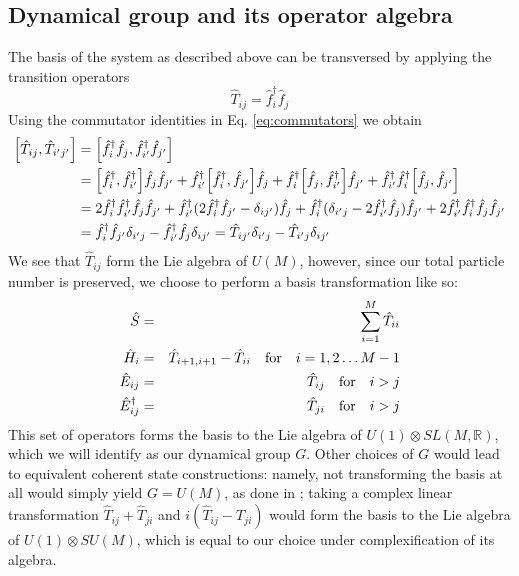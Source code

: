 \documentclass[12pt]{article}
\newcommand{\hc}{^\dagger}
\begin{document}
	\subsection{Dynamical group and its operator algebra}
	The basis of the system as described above can be transversed by applying the transition operators
	\begin{equation}
	\hat{T}_{ij}=\hat{f}\hc_i\hat{f}_j
	\end{equation}
	Using the commutator identities in Eq. \ref{eq:commutators} we obtain
	\begin{align}\label{eq:transition commutator}
	\comm{\hat{T}_{ij}}{\hat{T}_{i'j'}}&=\comm{\hat{f}\hc_i\hat{f}_j}{\hat{f}\hc_{i'}\hat{f}_{j'}}\nonumber\\
	&=\comm{\hat{f}\hc_i}{\hat{f}\hc_{i'}}\hat{f}_j\hat{f}_{j'}+\hat{f}\hc_{i'}\comm{\hat{f}\hc_i}{\hat{f}_{j'}}\hat{f}_j+\hat{f}\hc_i\comm{\hat{f}_j}{\hat{f}\hc_{i'}}\hat{f}_{j'}+\hat{f}\hc_{i'}\hat{f}\hc_i\comm{\hat{f}_j}{\hat{f}_{j'}}\nonumber\\
	&=2\hat{f}\hc_i\hat{f}\hc_{i'}\hat{f}_j\hat{f}_{j'}+\hat{f}\hc_{i'}(2\hat{f}\hc_i\hat{f}_{j'}-\delta_{ij'})\hat{f}_j+\hat{f}\hc_i(\delta_{i'j}-2\hat{f}\hc_{i'}\hat{f}_j)\hat{f}_{j'}+2\hat{f}\hc_{i'}\hat{f}\hc_i\hat{f}_j\hat{f}_{j'}\nonumber\\
	&=\hat{f}\hc_i\hat{f}_{j'}\delta_{i'j}-\hat{f}\hc_{i'}\hat{f}_j\delta_{ij'}=\hat{T}_{ij'}\delta_{i'j}-\hat{T}_{i'j}\delta_{ij'}
	\end{align}
	We see that $\hat{T}_{ij}$ form the Lie algebra of $U(M)$, however, since our total particle number is preserved, we choose to perform a basis transformation like so:
	\begin{eqnarray*}
	\hat{S}&=&\sum_{i=1}^M\hat{T}_{ii}\\
	\hat{H}_i&=&\hat{T}_{i+1,i+1}-\hat{T}_{ii}\qq{for}i=1,2\dots M-1\\
	\hat{E}_{ij}&=&\hat{T}_{ij}\qq{for}i>j\\
	\hat{E}_{ij}^\dagger &=&\hat{T}_{ji}\qq{for}i>j
	\end{eqnarray*}
	This set of operators forms the basis to the Lie algebra of $U(1)\otimes SL(M,\mathbb{R})$, which we will identify as our dynamical group $G$. Other choices of $G$ would lead to equivalent coherent state constructions: namely, not transforming the basis at all would simply yield $G=U(M)$, as done in \cite[Sec. 4.3.4]{dynamical_groups}; taking a complex linear transformation $\hat{T}_{ij}+\hat{T}_{ji}$ and $i(\hat{T}_{ij}-\hat{T}_{ji})$ would form the basis to the Lie algebra of $U(1)\otimes SU(M)$, which is equal to our choice under complexification of its algebra.
	
\end{document}

